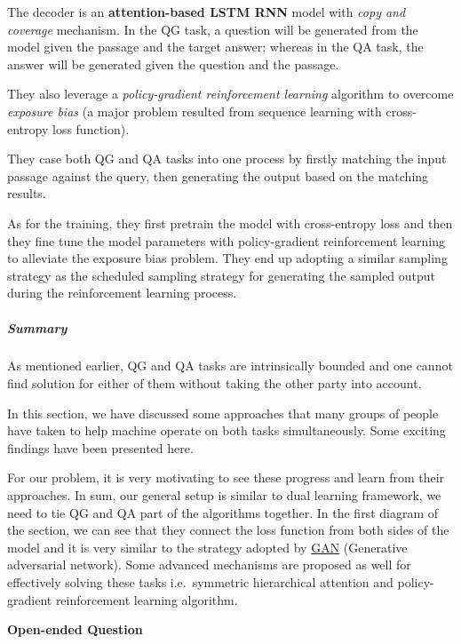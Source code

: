 \documentclass{acm_proc_article-sp}
\renewcommand{\paragraph}[1]{\vskip 6pt\noindent\textbf{#1 }}
\begin{document}
The decoder is an \textbf{attention-based LSTM RNN} model with
\emph{copy and coverage} mechanism. In the QG task, a question will be
generated from the model given the passage and the target answer;
whereas in the QA task, the answer will be generated given the question
and the passage.

They also leverage a \emph{policy-gradient reinforcement learning}
algorithm to overcome \emph{exposure bias} (a major problem resulted
from sequence learning with cross-entropy loss function).

They case both QG and QA tasks into one process by firstly matching the
input passage against the query, then generating the output based on the
matching results.

As for the training, they first pretrain the model with cross-entropy
loss and then they fine tune the model parameters with policy-gradient
reinforcement learning to alleviate the exposure bias problem. They end
up adopting a similar sampling strategy as the scheduled sampling
strategy for generating the sampled output during the reinforcement
learning process.

\subparagraph{Summary}\label{summary-2}

As mentioned earlier, QG and QA tasks are intrinsically bounded and one
cannot find solution for either of them without taking the other party
into account.

In this section, we have discussed some approaches that many groups of
people have taken to help machine operate on both tasks simultaneously.
Some exciting findings have been presented here.

For our problem, it is very motivating to see these progress and learn
from their approaches. In sum, our general setup is similar to dual
learning framework, we need to tie QG and QA part of the algorithms
together. In the first diagram of the section, we can see that they
connect the loss function from both sides of the model and it is very
similar to the strategy adopted by
\href{https://en.wikipedia.org/wiki/Generative_adversarial_network}{GAN}
(Generative adversarial network). Some advanced mechanisms are proposed
as well for effectively solving these tasks i.e.~symmetric hierarchical
attention and policy-gradient reinforcement learning algorithm.

\paragraph{Open-ended Question}\label{open-ended-question}
\end{document}
